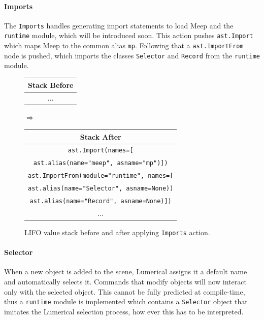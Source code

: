 \paragraph{Imports}
The \texttt{Imports} handles generating import statements to load Meep and the \texttt{runtime} module, which will be introduced soon. This action pushes \texttt{ast.Import} which maps Meep to the common alias \texttt{mp}. Following that a \texttt{ast.ImportFrom} node is pushed, which imports the classes \texttt{Selector} and \texttt{Record} from the \texttt{runtime} module.
\begin{figure}[H] \label{fig:imports-stack}
  \centering
  {\small
  \begin{tabular}{|c|}
    \hline
    \textbf{Stack Before} \\ \hline
    \(\dots\)                       \\ \hline
  \end{tabular}
  \hspace{0.25em}$\Longrightarrow$\hspace{0.25em}
  \begin{tabular}{|c|}
    \hline
    \textbf{Stack After} \\ \hline
    \texttt{\tiny{ast.}}\texttt{Import(names=[}\\
    \texttt{\tiny{ast.}}\texttt{alias(name="meep", asname="mp")])}\\ \hline
    \texttt{\tiny{ast.}}\texttt{ImportFrom(module="runtime", names=[}\\
    \texttt{\tiny{ast.}}\texttt{alias(name="Selector", asname=None))}\\   
    \texttt{\tiny{ast.}}\texttt{alias(name="Record", asname=None)])}\\ \hline    
    \(\dots\)                       \\ \hline
  \end{tabular}
  }
  \caption{LIFO value stack before and after applying \texttt{Imports} action.}
\end{figure}


\paragraph{Selector}
When a new object is added to the scene, Lumerical assigns it a default name and automatically selects it. Commands that modify objects will now interact only with the selected object. This cannot be fully predicted at compile-time, thus a \texttt{runtime} module is implemented which contains a \texttt{Selector} object that imitates the Lumerical selection process, how ever this has to be interpreted. 


